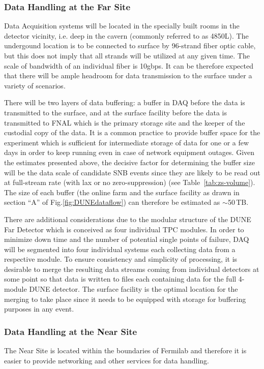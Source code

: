 \subsubsection{Data Handling at the Far Site}
Data Acquisition systems will be located in the specially built rooms in the detector vicinity, i.e. deep in the cavern (commonly referred to as 4850L).
The undergound location is to be connected to surface by 96-strand fiber optic cable, but this does not imply that all strands will be
utilized at any given time. The scale of bandwidth of an individual fiber is 10gbps. It can be therefore expected that there will be ample headroom
for data transmission to the surface under a variety of scenarios.

There will be two layers of data buffering: a buffer in DAQ before the data is transmitted to the surface,
and at the surface facility before the data is transmitted to FNAL which is the primary storage site and the
keeper of the custodial copy of the data. It is a common practice to provide buffer space for the experiment
which is sufficient for intermediate storage of data for one or a few days in order to keep running even in case
of network equipment outages. Given the estimates presented above, the decisive factor for determining the buffer
size will be the data scale of candidate SNB events since they are likely to be read out at full-stream rate (with lax or
no zero-suppression) (see Table~\ref{tab:zs-volume}). The size of each buffer (the online farm and the surface facility
as drawn in section ``A'' of Fig.\ref{fig:DUNEdataflow}) can therefore be estimated as $\sim$50\,TB.

 There are additional considerations due to the modular structure of the DUNE Far Detector
which is conceived as four individual TPC modules. In order to minimize down time and the number of potential single points of failure,
DAQ will be segmented into four individual  systems each collecting data from a respective module. To ensure
consistency and simplicity of processing, it is desirable to merge the resulting data streams coming from individual detectors at some point
so that data is written to files each containing data for the full 4-module DUNE detector. The surface facility is the optimal location
for the merging to take place since it needs to be equipped with storage for buffering purposes in any event.

\subsubsection{Data Handling at the Near Site}
The Near Site is located within the boundaries of Fermilab and therefore it is easier to provide networking and other services for data handling.


